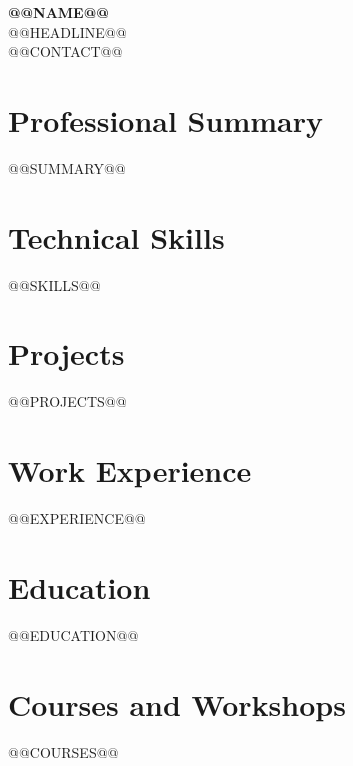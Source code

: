 \documentclass[10pt,a4paper]{article}
\begin{document}
\begin{center}
{\LARGE\bfseries @@NAME@@}\\[3pt]
{\normalsize @@HEADLINE@@}\\[3pt]
@@CONTACT@@
\end{center}
\vspace{-7pt}

\section*{Professional Summary}
@@SUMMARY@@

\section*{Technical Skills}
@@SKILLS@@

\section*{Projects}
@@PROJECTS@@

\section*{Work Experience}
@@EXPERIENCE@@

\section*{Education}
@@EDUCATION@@

\section*{Courses and Workshops}
@@COURSES@@
\end{document}
